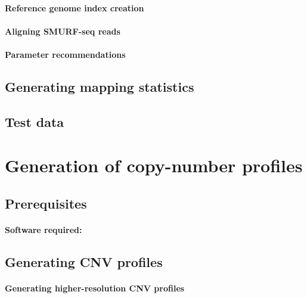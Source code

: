 \documentclass[11pt]{article}
\begin{document}
\paragraph{Reference genome index creation}

\paragraph{Aligning SMURF-seq reads}

\paragraph{Parameter recommendations}


\subsection{Generating mapping statistics}

\subsection{Test data}


\section{Generation of copy-number profiles}
\label{cnv}

\subsection{Prerequisites}
\paragraph{Software required:}

\subsection{Generating CNV profiles}

\paragraph{Generating higher-resolution CNV profiles}
\end{document}
